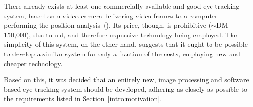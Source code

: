 There already exists at least one commercially available and good eye
tracking system, based on a video camera delivering video frames to a
computer performing the position-analysis~(\cite{antrag}).  Its price,
though, is prohibitive ($\sim$DM 150,000), due to old, and therefore
expensive technology being employed.  The simplicity of this system,
on the other hand, suggests that it ought to be possible to develop a
similar system for only a fraction of the costs, employing new and
cheaper technology.

Based on this, it was decided that an entirely new, image processing
and software based eye tracking system should be developed, adhering
as closely as possible to the requirements listed in
Section~\ref{intro:motivation}. 

